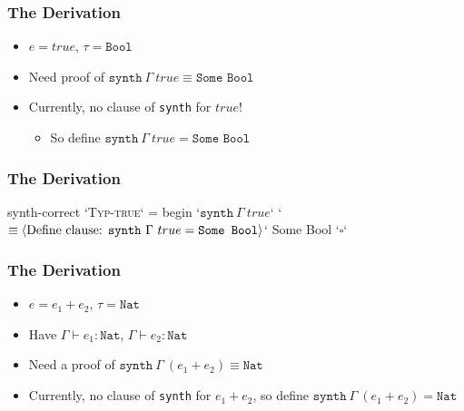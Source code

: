 \documentclass[usenames,dvipsnames]{beamer}
\newcommand{\synth}{\texttt{synth}}
\newcommand{\Nat}{\texttt{Nat}}
\begin{document}
{
  \begin{frame}
    \frametitle{The Derivation}

    \begin{itemize}
      \item $e = true$, $\tau = \texttt{Bool}$
      \item Need proof of $\synth\ \Gamma\ true \equiv \texttt{Some Bool}$
      \item Currently, no clause of \synth{} for $true$!
        \begin{itemize}
          \item So define $\synth\ \Gamma\ true = \texttt{Some Bool}$
        \end{itemize}
    \end{itemize}
  \end{frame}
}


{
  \begin{frame}[fragile]
    \frametitle{The Derivation}

    \begin{code}
      synth-correct `\textsc{Typ-true}` = begin
          `$\synth\ \Gamma\ true$`
        `$\equiv\langle \textnormal{Define clause: }\synth\ \Gamma\ true = \texttt{Some Bool} \rangle$`
          Some Bool
        `$\square$`
    \end{code}
  \end{frame}
}


{
  \begin{frame}
    \frametitle{The Derivation}

    \begin{itemize}
      \item $e = e_1 + e_2$, $\tau = \Nat$
      \item Have $\Gamma \vdash e_1 : \Nat$, $\Gamma \vdash e_2 : \Nat$
      \item Need a proof of $\synth\ \Gamma\ (e_1+e_2) \equiv \Nat$
      \item Currently, no clause of \synth{} for $e_1+e_2$, so define
        $\synth\ \Gamma\ (e_1+e_2) = \Nat$
    \end{itemize}
  \end{frame}
}
\end{document}
